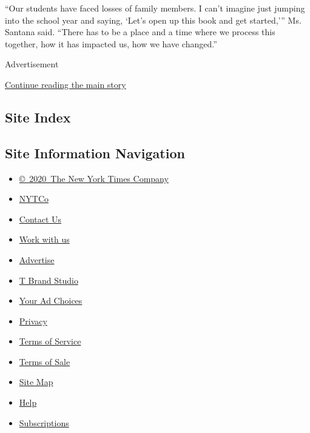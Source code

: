 ``Our students have faced losses of family members. I can't imagine just
jumping into the school year and saying, `Let's open up this book and
get started,''' Ms. Santana said. ``There has to be a place and a time
where we process this together, how it has impacted us, how we have
changed.''

Advertisement

\protect\hyperlink{after-bottom}{Continue reading the main story}

\hypertarget{site-index}{%
\subsection{Site Index}\label{site-index}}

\hypertarget{site-information-navigation}{%
\subsection{Site Information
Navigation}\label{site-information-navigation}}

\begin{itemize}
\tightlist
\item
  \href{https://help.nytimes.com/hc/en-us/articles/115014792127-Copyright-notice}{©~2020~The
  New York Times Company}
\end{itemize}

\begin{itemize}
\tightlist
\item
  \href{https://www.nytco.com/}{NYTCo}
\item
  \href{https://help.nytimes.com/hc/en-us/articles/115015385887-Contact-Us}{Contact
  Us}
\item
  \href{https://www.nytco.com/careers/}{Work with us}
\item
  \href{https://nytmediakit.com/}{Advertise}
\item
  \href{http://www.tbrandstudio.com/}{T Brand Studio}
\item
  \href{https://www.nytimes.com/privacy/cookie-policy\#how-do-i-manage-trackers}{Your
  Ad Choices}
\item
  \href{https://www.nytimes.com/privacy}{Privacy}
\item
  \href{https://help.nytimes.com/hc/en-us/articles/115014893428-Terms-of-service}{Terms
  of Service}
\item
  \href{https://help.nytimes.com/hc/en-us/articles/115014893968-Terms-of-sale}{Terms
  of Sale}
\item
  \href{https://spiderbites.nytimes.com}{Site Map}
\item
  \href{https://help.nytimes.com/hc/en-us}{Help}
\item
  \href{https://www.nytimes.com/subscription?campaignId=37WXW}{Subscriptions}
\end{itemize}
